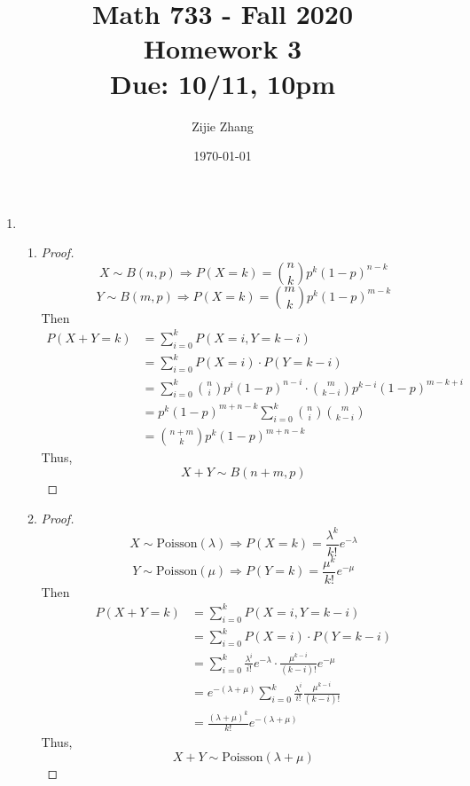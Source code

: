 \documentclass{article}
\title{Math 733 - Fall 2020\\
        {\Large \textbf{Homework 3}}\\
        {\normalsize \textbf{Due: 10/11, 10pm}}
    }
\author{Zijie Zhang}
\date{\today}
\begin{document}
    \maketitle
    \begin{enumerate}
        \item 
        \begin{enumerate}
        \item \begin{proof} 
            $$X\sim B(n,p) \Rightarrow P(X=k)=\binom{n}{k}p^k(1-p)^{n-k}$$
            $$Y\sim B(m,p) \Rightarrow P(X=k)=\binom{m}{k}p^k(1-p)^{m-k}$$
            Then \begin{align*}
                P(X+Y=k)&=\sum_{i=0}^k P(X=i, Y=k-i)\\
                &=\sum_{i=0}^k P(X=i)\cdot P(Y=k-i)\\
                &=\sum_{i=0}^k \binom{n}{i}p^i(1-p)^{n-i}
                    \cdot \binom{m}{k-i}p^{k-i}(1-p)^{m-k+i}\\
                &=p^k(1-p)^{m+n-k}\sum_{i=0}^k \binom{n}{i}\binom{m}{k-i}\\
                &=\binom{n+m}{k}p^k(1-p)^{m+n-k}
            \end{align*}
            Thus, $$X+Y \sim B(n+m,p)$$
        \end{proof}
        \item \begin{proof}
            $$X\sim \text{Poisson}(\lambda) \Rightarrow P(X=k)=\frac{\lambda^k}{k!}e^{-\lambda}$$
            $$Y\sim \text{Poisson}(\mu) \Rightarrow P(Y=k)=\frac{\mu^k}{k!}e^{-\mu}$$
            Then \begin{align*}
                P(X+Y=k)&=\sum_{i=0}^k P(X=i, Y=k-i)\\
                &=\sum_{i=0}^k P(X=i)\cdot P(Y=k-i)\\
                &=\sum_{i=0}^k \frac{\lambda^i}{i!}e^{-\lambda}
                    \cdot \frac{\mu^{k-i}}{(k-i)!}e^{-\mu}\\
                &=e^{-(\lambda+\mu)}\sum_{i=0}^k \frac{\lambda^i}{i!}\frac{\mu^{k-i}}{(k-i)!}\\
                &=\frac{(\lambda+\mu)^k}{k!}e^{-(\lambda+\mu)}
            \end{align*}
            Thus, $$X+Y \sim \text{Poisson}(\lambda+\mu)$$
        \end{proof}
        \end{enumerate}



\end{enumerate}
\end{document}

